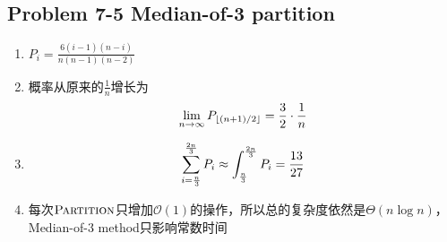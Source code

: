 \subsection*{Problem 7-5 Median-of-3 partition}
\begin{enumerate}
	\item	$P_i = \frac{6(i - 1)(n - i)}{n(n - 1)(n - 2)}$
	\item	概率从原来的$\frac{1}{n}$增长为
		\begin{equation} \notag
			\lim_{n \rightarrow \infty} P_{\lfloor (n + 1) / 2 \rfloor} = \frac{3}{2} \cdot \frac{1}{n}
		\end{equation}
	\item
		\begin{equation} \notag
			\sum_{i = \frac{n}{3}}^{\frac{2n}{3}} P_i \approx \int_{\frac{n}{3}}^{\frac{2n}{3}} P_i = \frac{13}{27}
		\end{equation}
	\item	每次$\textnormal{\scshape Partition}$只增加$\mathcal{O}(1)$的操作，所以总的复杂度依然是$\Theta(n \log n)$，Median-of-3 method只影响常数时间
\end{enumerate}

